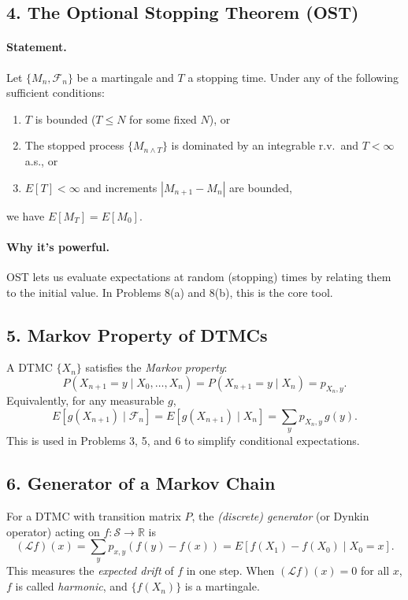 \documentclass[11pt]{article}
\newcommand{\R}{\mathbb{R}}
\newcommand{\F}{\mathcal{F}}
\newcommand{\1}{\mathbf{1}}
\theoremstyle{plain}
\begin{document}
\subsection*{4. The Optional Stopping Theorem (OST)}

\paragraph{Statement.}
Let $\{M_n,\F_n\}$ be a martingale and $T$ a stopping time. Under any of the
following sufficient conditions:
\begin{enumerate}[label=(\alph*)]
  \item $T$ is bounded ($T\le N$ for some fixed $N$), or
  \item The stopped process $\{M_{n\wedge T}\}$ is dominated by an integrable
        r.v.\ and $T<\infty$ a.s., or
  \item $E[T]<\infty$ and increments $|M_{n+1}-M_n|$ are bounded,
\end{enumerate}
we have $E[M_T]=E[M_0]$.

\paragraph{Why it's powerful.}
OST lets us evaluate expectations at random (stopping) times by relating them to
the initial value. In Problems 8(a) and 8(b), this is the core tool.

\subsection*{5. Markov Property of DTMCs}

A DTMC $\{X_n\}$ satisfies the \emph{Markov property}:
\[
  P(X_{n+1}=y\mid X_0,\ldots,X_n) = P(X_{n+1}=y\mid X_n) = p_{X_n,y}.
\]
Equivalently, for any measurable $g$,
\[
  E[g(X_{n+1})\mid\mathcal{F}_n] = E[g(X_{n+1})\mid X_n]
  = \sum_{y}p_{X_n,y}\,g(y).
\]
This is used in Problems 3, 5, and 6 to simplify conditional expectations.

\subsection*{6. Generator of a Markov Chain}

For a DTMC with transition matrix $P$, the \emph{(discrete) generator} (or
Dynkin operator) acting on $f:\mathcal{S}\to\R$ is
\[
  (\mathcal{L}f)(x) = \sum_{y}p_{x,y}(f(y)-f(x)) = E[f(X_1)-f(X_0)\mid X_0=x].
\]
This measures the \emph{expected drift} of $f$ in one step. When $(\mathcal{L}f)(x)=0$
for all $x$, $f$ is called \emph{harmonic}, and $\{f(X_n)\}$ is a martingale.
\end{document}
